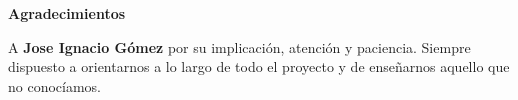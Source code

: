 \newpage
\begin{center}
{\bf \Huge Agradecimientos}
\end{center}
\vspace{1cm}
\setlength{\baselineskip}{0.8cm}

A \textbf{Jose Ignacio Gómez} por su implicación, atención y paciencia. Siempre dispuesto a orientarnos a lo largo de todo el proyecto y de enseñarnos aquello que no conocíamos.

